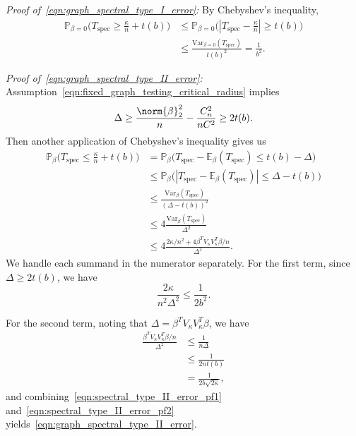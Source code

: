 \documentclass{article}
\newcommand{\abs}[1]{\left \lvert #1 \right \rvert}
\newcommand{\Var}{\mathrm{Var}}
\newcommand{\1}{\mathbf{1}}
\newcommand{\Pbb}{\mathbb{P}}
\newcommand{\Ebb}{\mathbb{E}}
\newcommand{\spec}{\mathrm{spec}}
\theoremstyle{alden}
\theoremstyle{aldenthm}
\theoremstyle{definition}
\theoremstyle{remark}
\begin{document}
\vspace{.2 in}

\textit{Proof of~\eqref{eqn:graph_spectral_type_I_error}:} By Chebyshev's inequality,
\begin{align*}
\Pbb_{\beta = 0}\bigl(T_{\spec} \geq \frac{\kappa}{n} + t(b)\bigr)
& \leq \Pbb_{\beta = 0}\bigl(\abs{T_{\spec} - \frac{\kappa}{n}} \geq t(b)\bigr) \\
& \leq \frac{\Var_{\beta = 0}(T_{\spec})}{t(b)^2} = \frac{1}{b^2}.
\end{align*}

\vspace{.2 in}

\textit{Proof of~\eqref{eqn:graph_spectral_type_II_error}:} Assumption~\eqref{eqn:fixed_graph_testing_critical_radius} implies
\begin{equation*}
\Delta \geq \frac{\norm{\beta}_2^2}{n} - \frac{C_n^2}{nC^2} \geq 2 t(b).
\end{equation*}
Then another application of Chebyshev's inequality gives us
\begin{align*}
\Pbb_{\beta}\bigl(T_{\spec} \leq \frac{\kappa}{n} + t(b)\bigr) & = \Pbb_{\beta}\bigl(T_{\spec} - \Ebb_{\beta}(T_{\spec}) \leq t(b) - \Delta \bigr) \\
& \leq \Pbb_{\beta}\bigl(\abs{T_{\spec} - \Ebb_{\beta}(T_{\spec})} \leq \Delta - t(b) \bigr) \tag{since $\Delta \geq t(b)$}	\\
& \leq \frac{\Var_{\beta}(T_{\spec})}{(\Delta - t(b))^2} \\
& \leq 4\frac{\Var_{\beta}(T_{\spec})}{\Delta^2} \tag{since $\Delta \geq 2t(b)$} \\
& \leq 4\frac{2\kappa/n^2 + 4\beta^T V_{\kappa} V_{\kappa}^T \beta /n}{\Delta^2}.
\end{align*}
We handle each summand in the numerator separately. For the first term, since $\Delta \geq 2 t(b)$, we have
\begin{equation}
\label{eqn:spectral_type_II_error_pf1}
\frac{2\kappa}{n^2\Delta^2} \leq \frac{1}{2b^2}.
\end{equation}

For the second term, noting that $\Delta = \beta^T V_{\kappa} V_{\kappa}^T \beta$, we have
\begin{align}
\frac{\beta^T V_{\kappa} V_{\kappa}^T \beta/n}{\Delta^2} & \leq \frac{1}{n\Delta} \nonumber \\
& \leq \frac{1}{2nt(b)} \nonumber \\
& = \frac{1}{2b\sqrt{2\kappa}}, \label{eqn:spectral_type_II_error_pf2}
\end{align}
and combining~\eqref{eqn:spectral_type_II_error_pf1} and~\eqref{eqn:spectral_type_II_error_pf2} yields~\eqref{eqn:graph_spectral_type_II_error}.
\end{document}
